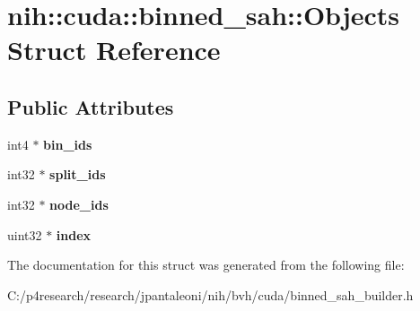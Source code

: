 \hypertarget{structnih_1_1cuda_1_1binned__sah_1_1_objects}{
\section{nih\-:\-:cuda\-:\-:binned\-\_\-sah\-:\-:\-Objects \-Struct \-Reference}
\label{structnih_1_1cuda_1_1binned__sah_1_1_objects}
}
\subsection*{\-Public \-Attributes}
\begin{DoxyCompactItemize}
\item 
\hypertarget{structnih_1_1cuda_1_1binned__sah_1_1_objects_a3f57033cd09c0296af4a05c95db4a97e}{
int4 $\ast$ {\bfseries bin\-\_\-ids}}
\label{structnih_1_1cuda_1_1binned__sah_1_1_objects_a3f57033cd09c0296af4a05c95db4a97e}

\item 
\hypertarget{structnih_1_1cuda_1_1binned__sah_1_1_objects_a78a94b6bd08e2ee0e0e9a7e1fe9b9476}{
int32 $\ast$ {\bfseries split\-\_\-ids}}
\label{structnih_1_1cuda_1_1binned__sah_1_1_objects_a78a94b6bd08e2ee0e0e9a7e1fe9b9476}

\item 
\hypertarget{structnih_1_1cuda_1_1binned__sah_1_1_objects_a39e5daf86a940b22eb79fafe506db1ec}{
int32 $\ast$ {\bfseries node\-\_\-ids}}
\label{structnih_1_1cuda_1_1binned__sah_1_1_objects_a39e5daf86a940b22eb79fafe506db1ec}

\item 
\hypertarget{structnih_1_1cuda_1_1binned__sah_1_1_objects_a0709f0e3baf173f76f712fb049ba8a7e}{
uint32 $\ast$ {\bfseries index}}
\label{structnih_1_1cuda_1_1binned__sah_1_1_objects_a0709f0e3baf173f76f712fb049ba8a7e}

\end{DoxyCompactItemize}


\-The documentation for this struct was generated from the following file\-:\begin{DoxyCompactItemize}
\item 
\-C\-:/p4research/research/jpantaleoni/nih/bvh/cuda/binned\-\_\-sah\-\_\-builder.\-h\end{DoxyCompactItemize}
